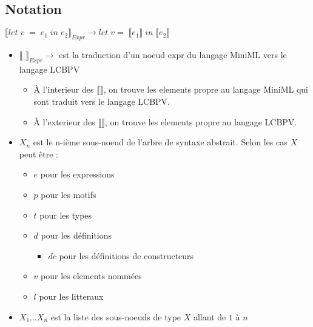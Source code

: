 \documentclass[
  12pt,
]{article}
\providecommand{\tightlist}{%
  \setlength{\itemsep}{0pt}\setlength{\parskip}{0pt}}
\begin{document}
\newcommand{\translateNode}[2]{\llbracket #1 \rrbracket_{#2}}
\newcommand{\translateResult}[1]{\llbracket #1 \rrbracket}
\newcommand{\isElemMiniML}[1]{\; \textcolor{Maroon}{#1} \;}
\newcommand{\isElemLCBPV}[1]{\textcolor{ForestGreen}{#1}}
\newcommand{\spaced}[1]{\; #1 \;}
\newcommand{\Tab}{\quad \quad \quad \quad \quad \quad \;}
\hypertarget{notation}{%
  \subsection{Notation}\label{notation}}
$ \translateNode{let \; v \; = \; e_1 \; in \; e_2}{Expr}  \rightarrow let \; v = \; \translateResult{e_1} \; in \; \translateResult{e_2}$
\begin{itemize}
  \tightlist
  \item
        $\translateNode{\_}{Expr}  \rightarrow $ est la traduction d'un noeud expr du langage MiniML vers le langage LCBPV
        \begin{itemize}
          \tightlist
          \item
                À l'interieur des $\translateResult{}$, on trouve les elements propre au langage MiniML qui sont traduit vers le langage LCBPV.
          \item
                À l'exterieur des $\translateResult{}$, on trouve les elements propre au langage LCBPV.
        \end{itemize}
  \item
        $X_n$ est le n-ième sous-noeud de l'arbre de syntaxe abstrait. \newline
        Selon les cas $X$ peut être :
        \begin{itemize}
          \tightlist
          \item
                $e$ pour les expressions
          \item
                $p$ pour les motifs
          \item
                $t$ pour les types
          \item
                $d$ pour les définitions
                \begin{itemize}
                  \tightlist
                  \item
                        $dc$ pour les définitions de constructeurs
                \end{itemize}
          \item
                $v$ pour les elements nommées
          \item
                $l$ pour les litteraux
        \end{itemize}
  \item
        $X_1 \dots X_n$ est la liste des sous-noeuds de type $X$ allant de $1$ à $n$
\end{itemize}
\end{document}
